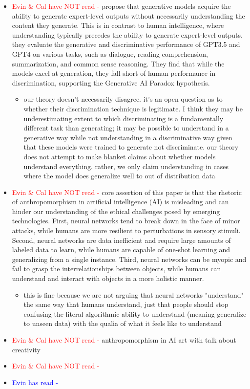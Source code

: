 \documentclass{article}
\begin{document}
\begin{itemize}
\begin{itemize}
        \item \textcolor{red}{Evin \& Cal have NOT read - } \cite{west2023generative} propose that generative models acquire the ability to generate expert-level outputs without necessarily understanding the content they generate. This is in contrast to human intelligence, where understanding typically precedes the ability to generate expert-level outputs. they evaluate the generative and discriminative performance of GPT3.5 and GPT4 on various tasks, such as dialogue, reading comprehension, summarization, and common sense reasoning. They find that while the models excel at generation, they fall short of human performance in discrimination, supporting the Generative AI Paradox hypothesis.
        \begin{itemize}
            \item our theory doesn't necessarily disagree. it's an open question as to whether their discrimination technique is legitimate. I think they may be underestimating extent to which discriminating is a fundamentally different task than generating; it may be possible to understand in a generative way while not understanding in a discriminative way given that these models were trained to generate not discriminate. our theory does not attempt to make blanket claims about whether models understand everything. rather, we only claim understanding in cases where the model does generalize well to out of distribution data
        \end{itemize}
        \item \textcolor{red}{Evin \& Cal have NOT read - } \cite{watson2019rhetoric} core assertion of this paper is that the rhetoric of anthropomorphism in artificial intelligence (AI) is misleading and can hinder our understanding of the ethical challenges posed by emerging technologies. First, neural networks tend to break down in the face of minor attacks, while humans are more resilient to perturbations in sensory stimuli. Second, neural networks are data inefficient and require large amounts of labeled data to learn, while humans are capable of one-shot learning and generalizing from a single instance. Third, neural networks can be myopic and fail to grasp the interrelationships between objects, while humans can understand and interact with objects in a more holistic manner.
        \begin{itemize}
            \item this is fine because we are not arguing that neural networks "understand" the same way that humans understand, just that people should stop confusing the literal algorithmic ability to understand (meaning generalize to unseen data) with the qualia of what it feels like to understand
        \end{itemize}
        \item \textcolor{red}{Evin \& Cal have NOT read - } \cite{millet2023defending} anthropomorphism in AI art with talk about creativity
        \item \textcolor{red}{Evin \& Cal have NOT read - }
        \item \textcolor{blue}{Evin has read -}
    \end{itemize}


\end{itemize}
\end{document}

